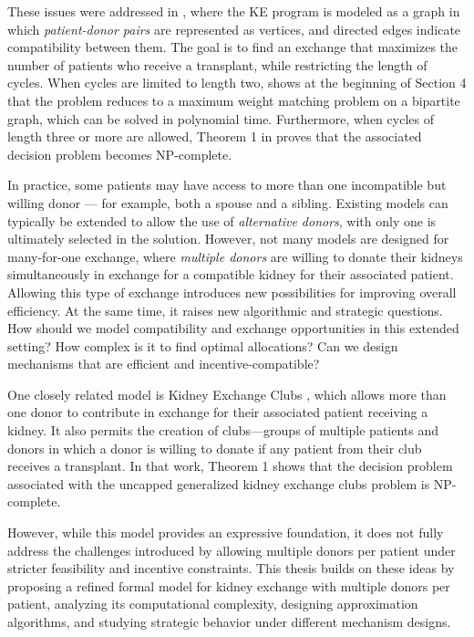These issues were addressed in \cite{abraham2007clearing}, where the \ac{KE} program is modeled as a graph in which \textit{patient-donor pairs} are represented as vertices, and directed edges indicate compatibility between them. The goal is to find an exchange that maximizes the number of patients who receive a transplant, while restricting the length of cycles. When cycles are limited to length two, \cite{abraham2007clearing} shows at the beginning of Section 4 that the problem reduces to a maximum weight matching problem on a bipartite graph, which can be solved in polynomial time. Furthermore, when cycles of length three or more are allowed, Theorem 1 in \cite{abraham2007clearing} proves that the associated decision problem becomes NP-complete.

In practice, some patients may have access to more than one incompatible but willing donor — for example, both a spouse and a sibling. Existing models can typically be extended to allow the use of \textit{alternative donors}, with only one is ultimately selected in the solution. However, not many models are designed for many-for-one exchange, where \textit{multiple donors} are willing to donate their kidneys simultaneously in exchange for a compatible kidney for their associated patient. Allowing this type of exchange introduces new possibilities for improving overall efficiency. At the same time, it raises new algorithmic and strategic questions. How should we model compatibility and exchange opportunities in this extended setting? How complex is it to find optimal allocations? Can we design mechanisms that are efficient and incentive-compatible?

One closely related model is Kidney Exchange Clubs \cite{farina2017operation}, which allows more than one donor to contribute in exchange for their associated patient receiving a kidney. It also permits the creation of clubs—groups of multiple patients and donors in which a donor is willing to donate if any patient from their club receives a transplant. In that work, Theorem 1 shows that the decision problem associated with the uncapped generalized kidney exchange clubs problem is NP-complete.

However, while this model provides an expressive foundation, it does not fully address the challenges introduced by allowing multiple donors per patient under stricter feasibility and incentive constraints. This thesis builds on these ideas by proposing a refined formal model for kidney exchange with multiple donors per patient, analyzing its computational complexity, designing approximation algorithms, and studying strategic behavior under different mechanism designs.

